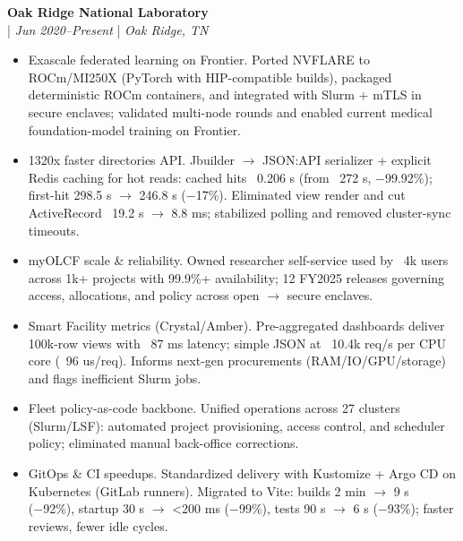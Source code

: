 \documentclass[11pt,a4paper]{article}
\newcommand{\regbullet}[1]{
    \item {\fontsize{10}{12}\selectfont #1}
}
\begin{document}
\noindent\textbf{Oak Ridge National Laboratory}\\
  |  {\fontsize{10}{12}\selectfont\textit{Jun 2020--Present}}  |  {\fontsize{10}{12}\selectfont\textit{Oak Ridge, TN}}
\begin{itemize}[leftmargin=18pt,itemsep=1pt,topsep=0pt]
\regbullet{Exascale federated learning on Frontier. Ported NVFLARE to ROCm/MI250X (PyTorch with HIP-compatible builds), packaged deterministic ROCm containers, and integrated with Slurm + mTLS in secure enclaves; validated multi-node rounds and enabled current medical foundation-model training on Frontier.}

\regbullet{1320x faster directories API. Jbuilder $\rightarrow$ JSON:API serializer + explicit Redis caching for hot reads: cached hits ~0.206 s (from ~272 s, −99.92\%); first-hit 298.5 s $\rightarrow$ 246.8 s (−17\%). Eliminated view render and cut ActiveRecord ~19.2 s $\rightarrow$ 8.8 ms; stabilized polling and removed cluster-sync timeouts.}

\regbullet{myOLCF scale \& reliability. Owned researcher self-service used by ~4k users across 1k+ projects with 99.9\%+ availability; 12 FY2025 releases governing access, allocations, and policy across open $\rightarrow$ secure enclaves.}

\regbullet{Smart Facility metrics (Crystal/Amber). Pre-aggregated dashboards deliver 100k-row views with ~87 ms latency; simple JSON at ~10.4k req/s per CPU core (~96 us/req). Informs next-gen procurements (RAM/IO/GPU/storage) and flags inefficient Slurm jobs.}

\regbullet{Fleet policy-as-code backbone. Unified operations across 27 clusters (Slurm/LSF): automated project provisioning, access control, and scheduler policy; eliminated manual back-office corrections.}

\regbullet{GitOps \& CI speedups. Standardized delivery with Kustomize + Argo CD on Kubernetes (GitLab runners). Migrated to Vite: builds 2 min $\rightarrow$ 9 s (−92\%), startup 30 s $\rightarrow$ <200 ms (−99\%), tests 90 s $\rightarrow$ 6 s (−93\%); faster reviews, fewer idle cycles.}


\end{itemize}
\end{document}

